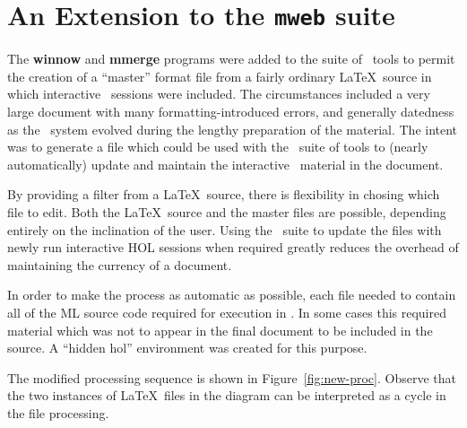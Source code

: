 
%

%

\section{An Extension to the {\tt mweb} suite}\label{sec-winnow}

The {\bf winnow} and {\bf mmerge} programs were added to the suite of
\mweb\ tools to permit the creation of a ``master'' format file from a
fairly ordinary \LaTeX\ source in which interactive \HOL\ sessions were
included.  The circumstances included a very large document with many
formatting-introduced errors, and generally datedness as the \HOL\ 
system evolved during the lengthy preparation of the material.
The intent was to generate a file which could be used with the \mweb\ 
suite of tools to (nearly automatically) update and maintain the
interactive \HOL\ material in the document. 

By providing a filter from a \LaTeX\ source, there is flexibility in
chosing which file to edit.  Both the \LaTeX\ source and the master
files are possible, depending entirely on the inclination of the user.
Using the \mweb\ suite to update the files with newly run interactive
HOL sessions when required greatly reduces the overhead of maintaining
the currency of a document.

In order to make the process as automatic as possible, each file
needed to contain all of the ML source code required for execution
in \HOL.  In some cases this required material which was not to appear
in the final document to be included in the source.  A ``hidden hol''
environment was created for this purpose. 

The modified processing sequence is shown in Figure~\ref{fig:new-proc}.
Observe that the two instances of \LaTeX\ files in the diagram can be
interpreted as a cycle in the file processing.


